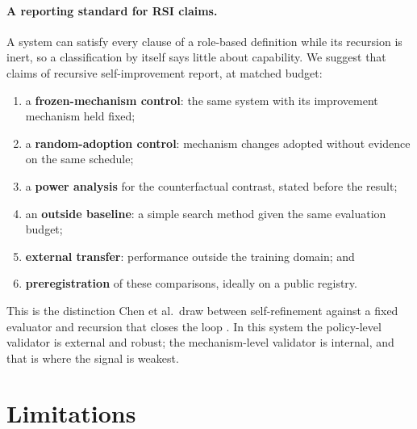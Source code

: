 \documentclass[11pt]{article}
\begin{document}
\paragraph{A reporting standard for RSI claims.} A system can satisfy every clause of a role-based definition while its recursion is inert, so a classification by itself says little about capability. We suggest that claims of recursive self-improvement report, at matched budget:
\begin{enumerate}
\item a \textbf{frozen-mechanism control}: the same system with its improvement mechanism held fixed;
\item a \textbf{random-adoption control}: mechanism changes adopted without evidence on the same schedule;
\item a \textbf{power analysis} for the counterfactual contrast, stated before the result;
\item an \textbf{outside baseline}: a simple search method given the same evaluation budget;
\item \textbf{external transfer}: performance outside the training domain; and
\item \textbf{preregistration} of these comparisons, ideally on a public registry.
\end{enumerate}
This is the distinction Chen et al.\ draw between self-refinement against a fixed evaluator and recursion that closes the loop \cite{chen2026rsi}. In this system the policy-level validator is external and robust; the mechanism-level validator is internal, and that is where the signal is weakest.

\section{Limitations}
\end{document}
